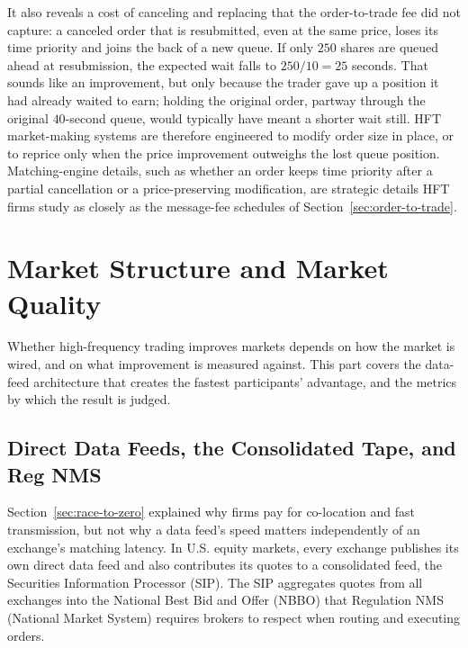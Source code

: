 \documentclass[../ai_in_finance]{subfiles}
\begin{document}
It also reveals a cost of canceling and replacing that the order-to-trade fee did not capture: a canceled order that is resubmitted, even at the same price, loses its time priority and joins the back of a new queue. If only $250$ shares are queued ahead at resubmission, the expected wait falls to $250/10=25$ seconds. That sounds like an improvement, but only because the trader gave up a position it had already waited to earn; holding the original order, partway through the original $40$-second queue, would typically have meant a shorter wait still. HFT market-making systems are therefore engineered to modify order size in place, or to reprice only when the price improvement outweighs the lost queue position. Matching-engine details, such as whether an order keeps time priority after a partial cancellation or a price-preserving modification, are strategic details HFT firms study as closely as the message-fee schedules of Section~\ref{sec:order-to-trade}.

\section{Market Structure and Market Quality}

Whether high-frequency trading improves markets depends on how the market is wired, and on what improvement is measured against. This part covers the data-feed architecture that creates the fastest participants' advantage, and the metrics by which the result is judged.

\subsection{Direct Data Feeds, the Consolidated Tape, and Reg NMS}
\label{sec:direct-feeds}

Section~\ref{sec:race-to-zero} explained why firms pay for co-location and fast transmission, but not why a data feed's speed matters independently of an exchange's matching latency. In U.S. equity markets, every exchange publishes its own direct data feed and also contributes its quotes to a consolidated feed, the Securities Information Processor (SIP). The SIP aggregates quotes from all exchanges into the National Best Bid and Offer (NBBO) that Regulation NMS (National Market System) requires brokers to respect when routing and executing orders.
\end{document}

